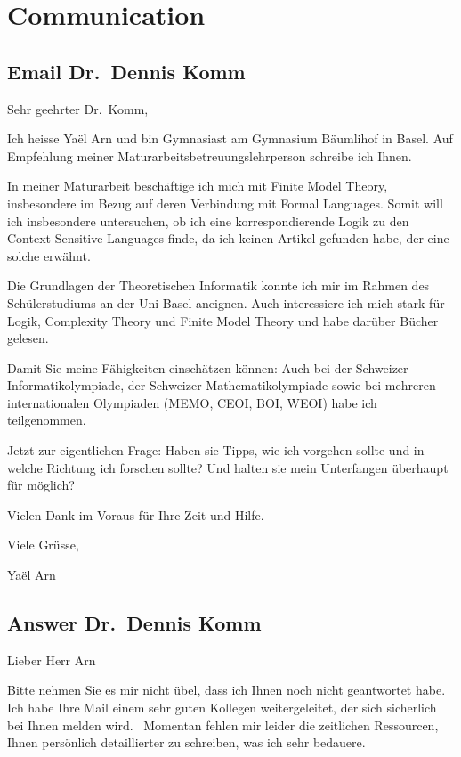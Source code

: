 \chapter{Communication}\label{ch:communications}


\section{Email Dr.~Dennis Komm}\label{email-dr.-dennis-komm}

Sehr geehrter Dr.~Komm,

Ich heisse Yaël Arn und bin Gymnasiast am Gymnasium Bäumlihof in Basel.
Auf Empfehlung meiner Maturarbeitsbetreuungslehrperson schreibe ich
Ihnen.

In meiner Maturarbeit beschäftige ich mich mit Finite Model Theory,
insbesondere im Bezug auf deren Verbindung mit Formal Languages. Somit
will ich insbesondere untersuchen, ob ich eine korrespondierende Logik
zu den Context-Sensitive Languages finde, da ich keinen Artikel gefunden
habe, der eine solche erwähnt.

Die Grundlagen der Theoretischen Informatik konnte ich mir im Rahmen des
Schülerstudiums an der Uni Basel aneignen. Auch interessiere ich mich
stark für Logik, Complexity Theory und Finite Model Theory und habe
darüber Bücher gelesen.

Damit Sie meine Fähigkeiten einschätzen können: Auch bei der Schweizer
Informatikolympiade, der Schweizer Mathematikolympiade sowie bei
mehreren internationalen Olympiaden (MEMO, CEOI, BOI, WEOI) habe ich
teilgenommen.

Jetzt zur eigentlichen Frage: Haben sie Tipps, wie ich vorgehen sollte
und in welche Richtung ich forschen sollte? Und halten sie mein
Unterfangen überhaupt für möglich?

Vielen Dank im Voraus für Ihre Zeit und Hilfe.

Viele Grüsse,

Yaël Arn


\section{Answer Dr.~Dennis Komm}\label{response-dr.-dennis-komm}

Lieber Herr Arn

Bitte nehmen Sie es mir nicht übel, dass ich Ihnen noch nicht
geantwortet habe.~ Ich habe Ihre Mail einem sehr guten Kollegen
weitergeleitet, der sich sicherlich bei Ihnen melden wird.~ Momentan
fehlen mir leider die zeitlichen Ressourcen, Ihnen persönlich
detaillierter zu schreiben, was ich sehr bedauere.

